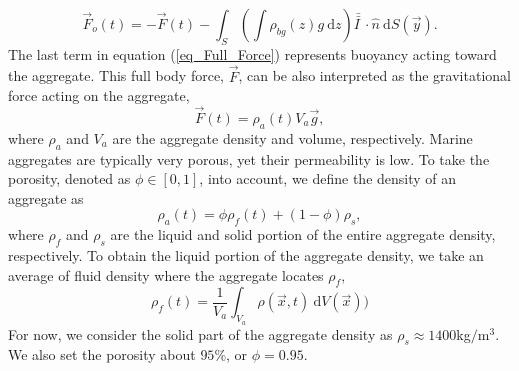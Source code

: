 \begin{equation}
	\vec{F}_o (t)
	  = - \vec{F}(t)
	  -  \int_S \left( 
	   \int \rho_{bg}(z) g \ \textrm{d}z 
	 \right) \bar{\bar{I \ }}  \cdot
	\hat{n} \ \textrm{d}S (\vec{y}).
\label{eq_Full_Force}
\end{equation}
The last term in equation (\ref{eq_Full_Force}) represents buoyancy acting toward the aggregate. 
This full body force, $\vec{F}$, can be also interpreted as the gravitational force acting on the aggregate,
\begin{equation}
	\vec{F}(t) = \rho_a(t) V_a \vec{g}, 
\end{equation}
where $\rho_a$  and $V_a$ are the aggregate density and volume, respectively. 
Marine aggregates are typically very porous, yet their permeability is low. To take the porosity, denoted as $\phi \in [0,1]$, into account, we define the density of an aggregate as 
\begin{equation}
	\rho_a (t) = \phi \rho_{f}(t) + (1-\phi) \rho_{s},
	\label{eq_rho_a}
\end{equation}
where $\rho_{f}$ and $\rho_s$ are the liquid and solid portion of the entire aggregate density, respectively. To obtain the liquid portion of the aggregate density, we take an average of fluid density where the aggregate locates $\rho_{f},$
\begin{equation}
	\rho_{f}(t) = \frac{1}{V_a}\int_{V_a} \rho(\vec{x}, t) \  \textrm{d}V(\vec{x}))
\end{equation}
For now, we consider the solid part of the aggregate density as $\rho_s \approx 1400 $kg$/$m$^3.$ 
We also set the porosity about $95\%$, or $\phi = 0.95$.


